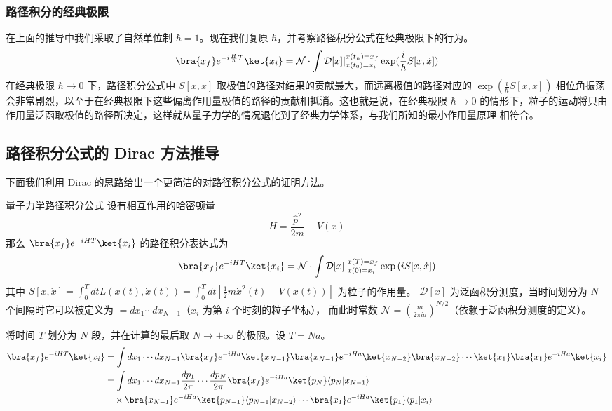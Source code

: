\subsubsection{路径积分的经典极限}
在上面的推导中我们采取了自然单位制 $\hbar=1$。现在我们复原 $\hbar$，并考察路径积分公式在经典极限下的行为。
\begin{equation}
\bra{x_f} e^{-i\frac{H}{\hbar}T}\ket{x_i}=\mathcal{N}\cdot \int \mathcal{D}[x]|_{x(t_0)=x_i}^{x(t_n)=x_f} \exp(\frac{i}{\hbar}S[x,\dot x])
\end{equation}
在经典极限 $\hbar\rightarrow 0$ 下，路径积分公式中 $S[x,\dot x]$ 取极值的路径对结果的贡献最大，而远离极值的路径对应的 $\exp(\frac{i}{\hbar}S[x,\dot x])$ 相位角振荡会非常剧烈，以至于在经典极限下这些偏离作用量极值的路径的贡献相抵消。这也就是说，在经典极限 $\hbar\rightarrow 0$ 的情形下，粒子的运动将只由作用量泛函取极值的路径所决定，这样就从量子力学的情况退化到了经典力学体系，与我们所知的最小作用量原理 相符合。

\subsection{路径积分公式的 Dirac 方法推导}
下面我们利用 Dirac 的思路给出一个更简洁的对路径积分公式的证明方法。
\begin{theorem}{量子力学路径积分公式}\label{the_PIntQM_1}
    设有相互作用的哈密顿量
    \begin{equation}
        H=\frac{\hat p^2}{2m}+V(x)
    \end{equation}
    那么 $\bra{x_f}e^{-iHT}\ket{x_i}$ 的路径积分表达式为
    \begin{equation}
        \bra{x_f}e^{-iHT}\ket{x_i}=\mathcal{N}\cdot\int \mathcal D[x]|_{x(0)=x_i}^{x(T)=x_f} \exp\left(iS[x,\dot x]\right)
    \end{equation}
    其中 $S[x,\dot x]=\int_0^T d t L(x(t),\dot x(t))=\int_0^T d t \left[\frac{1}{2}m\dot{x}^2(t)-V(x(t))\right]$ 为粒子的作用量。
    $\mathcal D[x]$ 为泛函积分测度，当时间划分为 $N$ 个间隔时它可以被定义为 $=d x_1\cdots d x_{N-1}$（$x_i$ 为第 $i$ 个时刻的粒子坐标），
    而此时常数 $\mathcal N=\left(\frac{m}{2\pi i a}\right)^{N/2}$（依赖于泛函积分测度的定义）。
\end{theorem}

将时间 $T$ 划分为 $N$ 段，并在计算的最后取 $N\rightarrow +\infty$ 的极限。设 $T=Na$。
\begin{equation}
\begin{aligned}
        \bra{x_f}e^{-iHT}\ket{x_i}&=\int d x_1\cdots d x_{N-1}
        \bra{x_f}e^{-iH a}\ket{x_{N-1}}\bra{x_{N-1}}e^{-iH a}
        \ket{x_{N-2}}\bra{x_{N-2}}\cdots \ket{x_{1}}\bra{x_{1}}e^{-iH a}\ket{x_i}
        \\
        &=\int d x_1\cdots d x_{N-1}\frac{d p_1}{2\pi} \cdots \frac{d p_N}{2\pi}
        \bra{x_f}e^{-iH a}\ket{p_N}\langle p_N|x_{N-1}\rangle 
        \\
        &\quad \times\bra{x_{N-1}}e^{-iH a}
        \ket{p_{N-1}}\langle p_{N-1}|x_{N-2}\rangle
        \cdots \bra{x_{1}}e^{-iH a}\ket{p_1}\langle p_1 | x_i\rangle
\end{aligned}
\end{equation}

